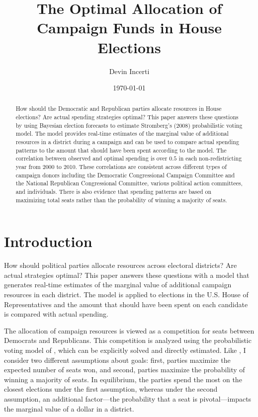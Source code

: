 \documentclass[12pt,final,fleqn]{article}
\theoremstyle{plain}
\begin{document}
\author{Devin Incerti}
\title{\textbf{The Optimal Allocation of Campaign Funds in House Elections}}
\date{\today}
\maketitle

\thispagestyle{empty}
\setcounter{page}{0}

\begin{singlespacing}
\begin{abstract}
How should the Democratic and Republican parties allocate resources in House elections? Are actual spending strategies optimal? This paper answers these questions by using Bayesian election forecasts to estimate Stromberg's (2008) probabilistic voting model. The model provides real-time estimates of the marginal value of additional resources in a district during a campaign and can be used to compare actual spending patterns to the amount that should have been spent according to the model. The correlation between observed and optimal spending is over $0.5$ in each non-redistricting year from 2000 to 2010. These correlations are consistent across different types of campaign donors including the Democratic Congressional Campaign Committee and the National Republican Congressional Committee, various political action committees, and individuals. There is also evidence that spending patterns are based on maximizing total seats rather than the probability of winning a majority of seats.
\end{abstract}
\end{singlespacing}

\clearpage
\doublespacing

\section{Introduction}
How should political parties allocate resources across electoral districts? Are actual strategies optimal? This paper answers these questions with a model that generates real-time estimates of the marginal value of additional campaign resources in each district. The model is applied to elections in the U.S. House of Representatives and the amount that should have been spent on each candidate is compared with actual spending. 

The allocation of campaign resources is viewed as a competition for seats between Democrats and Republicans. This competition is analyzed using the probabilistic voting model of \citet{stromberg2008electoral}, which can be explicitly solved and directly estimated. Like \citet{snyder1989election}, I consider two different assumptions about goals: first, parties maximize the expected number of seats won, and second, parties maximize the probability of winning a majority of seats. In equilibrium, the parties spend the most on the closest elections under the first assumption, whereas under the second assumption, an additional factor---the probability that a seat is pivotal---impacts the marginal value of a dollar in a district.
\end{document}
